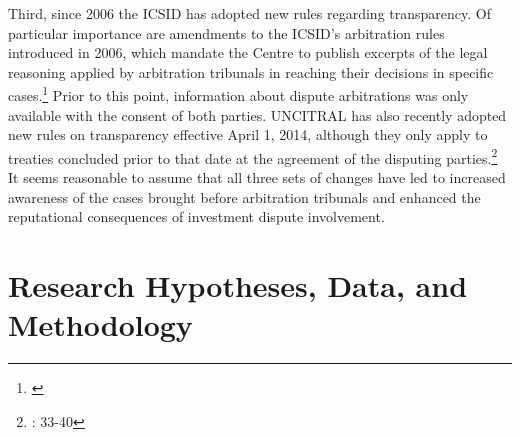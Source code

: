 \documentclass[12pt,onesided]{amsart}
\begin{document}
Third, since 2006 the ICSID has adopted new rules regarding transparency. Of particular importance are amendments to the ICSID's arbitration rules introduced in 2006, which mandate the Centre to publish excerpts of the legal reasoning applied by arbitration tribunals in reaching their decisions in specific cases.\footnote{\citet{yackee20112006,antonietti:2006}} Prior to this point, information about dispute arbitrations was only available with the consent of both parties. UNCITRAL has also recently adopted new rules on transparency effective April 1, 2014, although they only apply to treaties concluded prior to that date at the agreement of the disputing parties.\footnote{\citet{uncitral:2013}: 33-40 } It seems reasonable to assume that all three sets of changes have led to increased awareness of the cases brought before arbitration tribunals and enhanced the reputational consequences of investment dispute involvement.


\section*{Research Hypotheses, Data, and Methodology}
\end{document}

